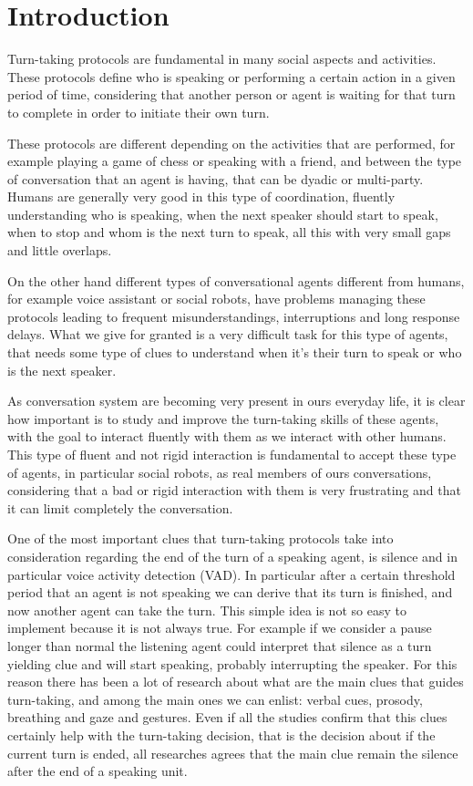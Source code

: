 \documentclass[../main.tex]{subfiles}
\begin{document}
\section{Introduction}
Turn-taking protocols are fundamental in many social aspects and activities. These protocols define who is speaking or performing a certain action in a given period of time, considering that another person or agent is waiting for that turn to complete in order to initiate their own turn. 

These protocols are different depending on the activities that are performed, for example playing a game of chess or speaking with a friend, and between the type of conversation that an agent is having, that can be dyadic or multi-party. Humans are generally very good in this type of coordination, fluently understanding who is speaking, when the next speaker should start to speak, when to stop and whom is the next turn to speak, all this with very small gaps and little overlaps. 

On the other hand different types of conversational agents different from humans, for example voice assistant or social robots, have problems managing these protocols leading to frequent misunderstandings, interruptions and long response delays. What we give for granted is a very difficult task for this type of agents, that needs some type of clues to understand when it's their turn to speak or who is the next speaker. 

As conversation system are becoming very present in ours everyday life, it is clear how important is to study and improve the turn-taking skills of these agents, with the goal to interact fluently with them as we interact with other humans. This type of fluent and not rigid interaction is fundamental to accept these type of agents, in particular social robots, as real members of ours conversations, considering that a bad or rigid interaction with them is very frustrating and that it can limit completely the conversation. 

One of the most important clues that turn-taking protocols take into consideration regarding the end of the turn of a speaking agent, is silence and in particular voice activity detection (VAD). In particular after a certain threshold period that an agent is not speaking we can derive that its turn is finished, and now another agent can take the turn. This simple idea is not so easy to implement because it is not always true. For example if we consider a pause longer than normal the listening agent could interpret that silence as a turn yielding clue and will start speaking, probably interrupting the speaker. For this reason there has been a lot of research about what are the main clues that guides turn-taking, and among the main ones we can enlist: verbal cues, prosody, breathing and gaze and gestures. Even if all the studies confirm that this clues certainly help with the turn-taking decision, that is the decision about if the current turn is ended, all researches agrees that the main clue remain the silence after the end of a speaking unit.
\end{document}
